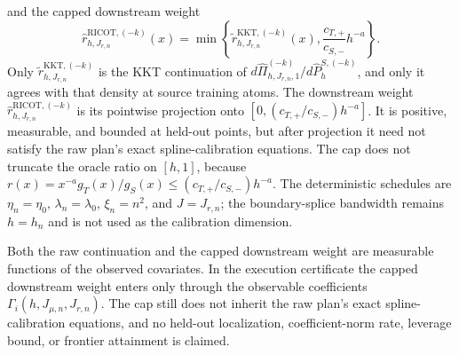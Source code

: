 and the capped downstream weight
\[
\widehat r^{\mathrm{RICOT},(-k)}_{h,J_{r,n}}(x)=\min\left\{\widetilde r^{\mathrm{KKT},(-k)}_{h,J_{r,n}}(x),\frac{c_{T,+}}{c_{S,-}}h^{-a}\right\}.
\]
Only \(\widetilde r^{\mathrm{KKT},(-k)}_{h,J_{r,n}}\) is the KKT continuation of \(d\widehat\Pi^{(-k)}_{h,J_{r,n},1}/d\widehat P^{S,(-k)}_h\), and only it agrees with that density at source training atoms. The downstream weight \(\widehat r^{\mathrm{RICOT},(-k)}_{h,J_{r,n}}\) is its pointwise projection onto \([0,(c_{T,+}/c_{S,-})h^{-a}]\). It is positive, measurable, and bounded at held-out points, but after projection it need not satisfy the raw plan's exact spline-calibration equations. The cap does not truncate the oracle ratio on \([h,1]\), because \(r(x)=x^{-a}g_T(x)/g_S(x)\le(c_{T,+}/c_{S,-})h^{-a}\). The deterministic schedules are \(\eta_n=\eta_0\), \(\lambda_n=\lambda_0\), \(\xi_n=n^2\), and \(J=J_{r,n}\); the boundary-splice bandwidth remains \(h=h_n\) and is not used as the calibration dimension.

Both the raw continuation and the capped downstream weight are measurable functions of the observed covariates. In the execution certificate the capped downstream weight enters only through the observable coefficients \(\Gamma_i(h,J_{\mu,n},J_{r,n})\). The cap still does not inherit the raw plan's exact spline-calibration equations, and no held-out localization, coefficient-norm rate, leverage bound, or frontier attainment is claimed.